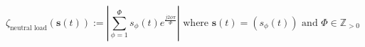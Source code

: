 \begin{equation}
	\zeta_\text{neutral load}(\textbf{s}(t)) := \left|\sum_{\phi=1}^{\Phi} s_\phi(t)e^{\frac{j2\phi\pi}{\Phi}}\right| \text{ where } \textbf{s}(t) = (s_\phi(t)) \text{ and } \Phi \in \mathbb{Z}_{>0}
\label{ch1:equ:neutral-load}
\end{equation}